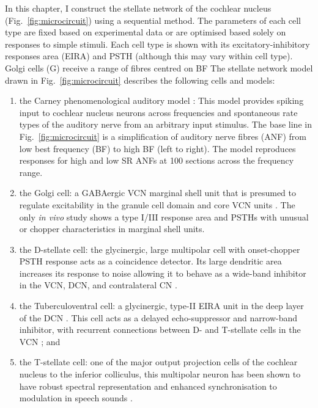 In this chapter, I construct the stellate network of the cochlear
nucleus (Fig.~\ref{fig:microcircuit}) using a sequential method.  The parameters of each cell type
are fixed based on experimental data or are optimised based solely on
responses to simple stimuli.  Each cell type is shown with its excitatory-inhibitory responses area (EIRA) and PSTH (although this may vary within cell type). Golgi cells (G) receive a range of fibres centred on BF
The stellate network model drawn in Fig.~\ref{fig:microcircuit} describes the following
cells and models:
\begin{enumerate}
\item the Carney phenomenological auditory model
  \citet{ZilanyBruceEtAl:2009}: This model provides spiking input to
  cochlear nucleus neurons across frequencies and spontaneous rate
  types of the auditory nerve from an arbitrary input stimulus. The
  base line in Fig.~\ref{fig:microcircuit} is a simplification of
  auditory nerve fibres (ANF) from low best frequency (BF) to high BF
  (left to right). The model reproduces responses for high and low SR
  ANFs at 100 sections across the frequency range.
\item the Golgi cell: a GABAergic VCN marginal shell unit that is
  presumed to regulate excitability in the granule cell domain and
  core VCN units \citep{FerragamoGoldingEtAl:1998}. The only \emph{in vivo} study shows a type I/III response area and PSTHs with unusual or chopper characteristics in marginal shell units\citep{GhoshalKim:1997}. 
\item the D-stellate cell: the glycinergic, large multipolar cell with
  onset-chopper PSTH response acts as a coincidence detector. Its
  large dendritic area increases its response to noise allowing it to
  behave as a wide-band inhibitor in the VCN, DCN, and contralateral CN 
  \citep{SmithMassieEtAl:2005,ArnottWallaceEtAl:2004,NeedhamPaolini:2007}.
\item the Tuberculoventral cell: a glycinergic, type-II EIRA unit in
  the deep layer of the DCN \citep{SpirouDavisEtAl:1999}.  This cell acts as a delayed
  echo-suppressor and narrow-band inhibitor, with recurrent
  connections between D- and T-stellate cells in the VCN \citep{Alibardi:2006,OertelWickesberg:1993,WickesbergWhitlonEtAl:1991}; and 
\item the T-stellate cell: one of the major output projection cells of
  the cochlear nucleus to the inferior colliculus, this multipolar
  neuron has been shown to have robust spectral representation and
  enhanced synchronisation to modulation in speech sounds \citep{BlackburnSachs:1990,KeilsonRichardsEtAl:1997}.
\end{enumerate}

